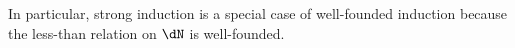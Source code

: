 \documentclass{amsart}
\begin{document}
In particular, strong induction is a special case of well-founded induction because the less-than relation on $\dN$ is well-founded.
\begin{code}%
%
\>[2]\AgdaSpace{}%
\AgdaOperator{\AgdaDatatype{\AgdaUnderscore{}<\AgdaUnderscore{}}}\AgdaSpace{}%
\AgdaSymbol{:}\AgdaSpace{}%
\AgdaSpace{}%
\AgdaSpace{}%
\AgdaSpace{}%
\AgdaSpace{}%
\AgdaSpace{}%
\<%
\\
\>[2][@{}l@{\AgdaIndent{0}}]%
\>[4]\AgdaSpace{}%
\AgdaSymbol{:}\AgdaSpace{}%
\AgdaSymbol{(}\AgdaSpace{}%
\AgdaSymbol{:}\AgdaSpace{}%
\AgdaSymbol{)}\AgdaSpace{}%
\AgdaSpace{}%
\AgdaSpace{}%
\AgdaOperator{\AgdaDatatype{<}}\AgdaSpace{}%
\AgdaSpace{}%
\<%
\\
%
\>[4]\AgdaSpace{}%
\AgdaSymbol{:}\AgdaSpace{}%
\AgdaSymbol{(}\AgdaSpace{}%
\AgdaSpace{}%
\AgdaSymbol{:}\AgdaSpace{}%
\AgdaSymbol{)}\AgdaSpace{}%
\AgdaSpace{}%
\AgdaSpace{}%
\AgdaOperator{\AgdaDatatype{<}}\AgdaSpace{}%
\AgdaSpace{}%
\AgdaSpace{}%
\AgdaSpace{}%
\AgdaOperator{\AgdaDatatype{<}}\AgdaSpace{}%
\AgdaSpace{}%
\<%
\\
%
\\[\AgdaEmptyExtraSkip]%
%
\>[2]\<%
\\
\>[2][@{}l@{\AgdaIndent{0}}]%
\>[4]\AgdaSpace{}%
\AgdaSymbol{:}\AgdaSpace{}%
\AgdaSpace{}%
\AgdaOperator{\AgdaDatatype{\AgdaUnderscore{}<\AgdaUnderscore{}}}\AgdaSpace{}%
\<%
\\
%
\>[4]\AgdaSpace{}%
\AgdaSymbol{=}\AgdaSpace{}%
\AgdaSpace{}%
\AgdaSpace{}%
\AgdaSpace{}%
\AgdaSpace{}%
\AgdaBound{\AgdaUnderscore{}}\AgdaSpace{}%
\AgdaSpace{}%
\AgdaSymbol{)}\AgdaSpace{}%
\<%
\\
\>[4][@{}l@{\AgdaIndent{0}}]%
\>[6]\AgdaSpace{}%
\AgdaSymbol{:}\AgdaSpace{}%
\AgdaSymbol{\{}\AgdaSpace{}%
\AgdaSymbol{:}\AgdaSpace{}%

\end{code}
\end{document}
